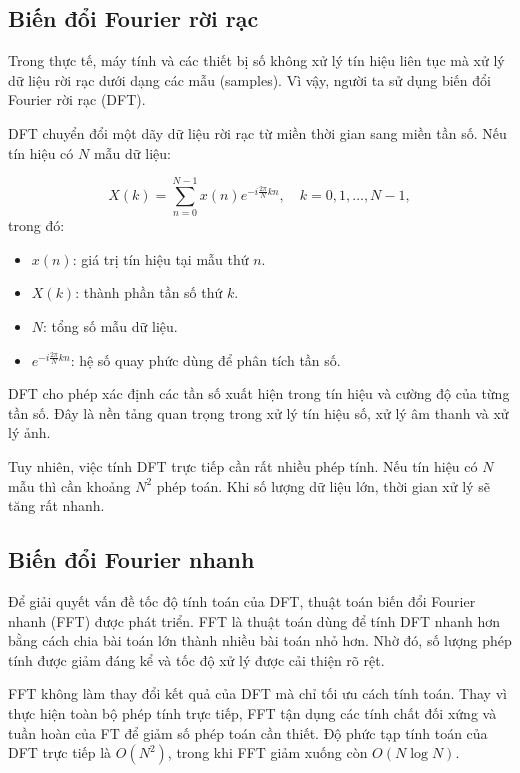 \subsection{Biến đổi Fourier rời rạc}

Trong thực tế, máy tính và các thiết bị số không xử lý tín hiệu liên tục mà xử
lý dữ liệu rời rạc dưới dạng các mẫu (samples). Vì vậy, người ta sử dụng biến
đổi Fourier rời rạc (DFT).

DFT chuyển đổi một dãy dữ liệu rời rạc từ miền thời gian sang miền tần số. Nếu
tín hiệu có $N$ mẫu dữ liệu:

\begin{equation}
  X(k)=\sum_{n=0}^{N-1}x(n)e^{-i\frac{2\pi}{N}kn},
  \quad k=0,1,\ldots,N-1,
\end{equation}
trong đó:
\begin{itemize}
    \item $x(n)$: giá trị tín hiệu tại mẫu thứ $n$.
    \item $X(k)$: thành phần tần số thứ $k$.
    \item $N$: tổng số mẫu dữ liệu.
    \item $e^{-i\frac{2\pi}{N}kn}$: hệ số quay phức dùng để phân tích tần số.
\end{itemize}

DFT cho phép xác định các tần số xuất hiện trong tín hiệu và cường độ của từng
tần số. Đây là nền tảng quan trọng trong xử lý tín hiệu số, xử lý âm thanh và
xử lý ảnh.

Tuy nhiên, việc tính DFT trực tiếp cần rất nhiều phép tính. Nếu tín hiệu có
$N$ mẫu thì cần khoảng $N^2$ phép toán. Khi số lượng dữ liệu lớn, thời gian xử
lý sẽ tăng rất nhanh.

\subsection{Biến đổi Fourier nhanh}

Để giải quyết vấn đề tốc độ tính toán của DFT, thuật toán biến đổi Fourier
nhanh (FFT) được phát triển. FFT là thuật toán dùng để tính DFT nhanh hơn bằng
cách chia bài toán lớn thành nhiều bài toán nhỏ hơn. Nhờ đó, số lượng phép tính
được giảm đáng kể và tốc độ xử lý được cải thiện rõ rệt.

FFT không làm thay đổi kết quả của DFT mà chỉ tối ưu cách tính toán. Thay vì
thực hiện toàn bộ phép tính trực tiếp, FFT tận dụng các tính chất đối xứng và
tuần hoàn của FT để giảm số phép toán cần thiết. Độ phức tạp tính toán của DFT
trực tiếp là $O(N^2)$, trong khi FFT giảm xuống còn $O(N\log N)$.

